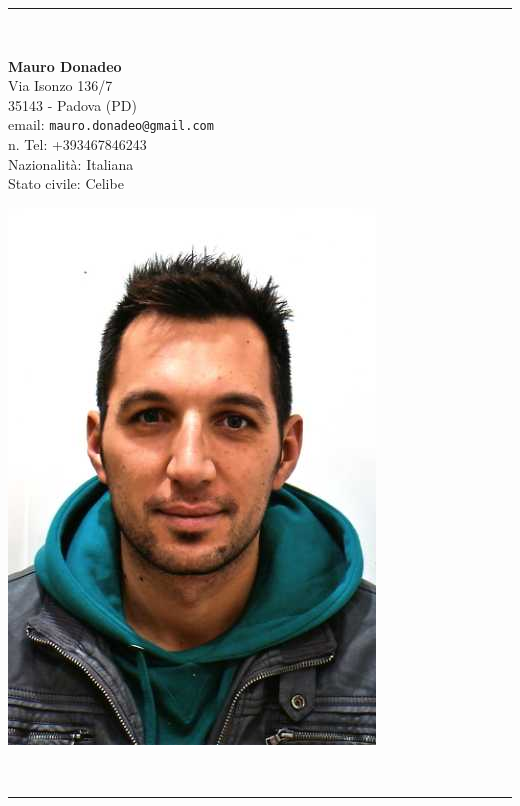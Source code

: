 \documentclass[pdftex,a4paper,12pt,twoside,titlepage,italian,openright]{article}
\begin{document}
\vspace*{.2cm}
\begin{center}
\rule{.8 \textwidth}{1pt}\\[5pt]
\begin{minipage}{.55\textwidth}
	\LARGE\textbf{Mauro Donadeo}\\[20pt]
	\footnotesize Via Isonzo 136/7 \\ 
	35143 - Padova (PD)\\
	email: \texttt{mauro.donadeo@gmail.com}\\
	\footnotesize n. Tel: +393467846243\\
	\footnotesize Nazionalità: Italiana\\
	\footnotesize Stato civile: Celibe\\
\end{minipage}
\begin{minipage}{.25\textwidth}
	\includegraphics[width=\textwidth]{io.jpg}
\end{minipage}\\[5pt]
\rule{.8 \textwidth}{1pt}
\end{center}
\end{document}
